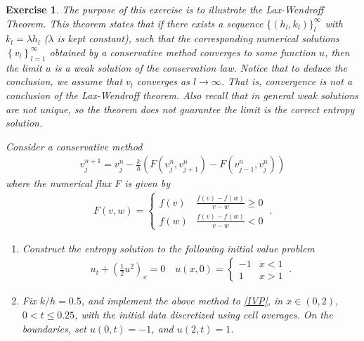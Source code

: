 \documentclass[10pt,letterpaper]{article}
\newcommand{\rb}[1]{ \left(  {#1} \right) }
\newcommand{\frb}[1]{ \left(  {#1} \right) }
\theoremstyle{break}
\newtheorem{exercise}{Exercise}
\begin{document}
\begin{exercise}
    The purpose of this exercise is to illustrate the \emph{Lax-Wendroff Theorem}.
    This theorem states that if there exists a sequence $\{(h_l,k_l)\}_l^\infty$ with $k_l = \lambda h_l$ ($\lambda$ is kept constant), such that the corresponding numerical solutions $\left\{ v_{l}\right\} _{l=1}^{\infty}$ obtained by a conservative method converges to some function $u$, then the limit $u$ is a weak solution of the conservation law. Notice that to deduce the conclusion, we assume that $v_{l}$ converges as $l\rightarrow\infty$.
    That is, convergence is not a conclusion of the Lax-Wendroff theorem.
    Also recall that in general weak solutions are not unique, so the theorem does not guarantee the limit is the correct entropy solution. 

    Consider a conservative method 
    \begin{gather}%
        v_{j}^{n+1}=v_{j}^{n} -\frac{k}{h}\left(
            F\frb{v_{j}^{n},v_{j+1}^{n}}-F\frb{v_{j-1}^{n},v_{j}^{n}}
            \right)
    \end{gather}%
    where the numerical flux F is given by 
    \begin{gather}%
        F\frb{v,w}=\begin{cases}
            f(v) & \frac{f(v)-f\frb{w}}{v-w}\geq0\\[0.5em]
            f\frb{w} & \frac{f(v)-f\frb{w}}{v-w}<0
        \end{cases}\ .
    \end{gather}%
    \begin{enumerate}
        \item
        Construct the entropy solution to the following initial value problem
        \begin{gather} \label{IVP}
            u_{t}+\rb{\frac{1}{2}u^{2}}_{x}=0
            \quad
                u(x,0)=\begin{cases}
                -1 & x<1\\
                1 & x>1
            \end{cases}\ .
        \end{gather}%
        \item
        Fix $k/h=0.5$, and implement the above method to \eqref{IVP}, in $x\in(0,2)$, $0<t\le0.25$, with the initial data 
        discretized using cell averages. On the boundaries, set $u(0,t)=-1$, and $u\frb{2,t}=1$.


\end{enumerate}
\end{exercise}
\end{document}
